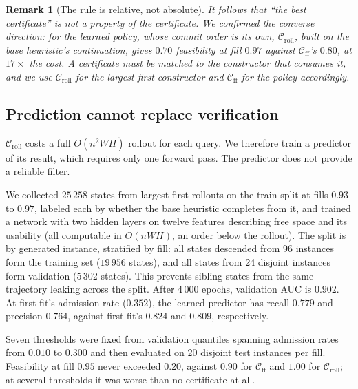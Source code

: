 \documentclass[preprint,12pt,authoryear]{elsarticle}
\newtheorem{rem}{Remark}
\newcommand{\cC}{\mathcal{C}}
\begin{document}
\begin{rem}[The rule is relative, not absolute]
\label{rem:witness}
It follows that ``the best certificate'' is not a property of the certificate. We
confirmed the converse direction: for the learned policy, whose commit order is
its own, $\cC_{\mathrm{roll}}$, built on the \emph{base heuristic's}
continuation, gives $0.70$ feasibility at fill $0.97$ against
$\cC_{\mathrm{ff}}$'s $0.80$, at $17\times$ the cost. A certificate must be
matched to the constructor that consumes it, and we use $\cC_{\mathrm{roll}}$ for
the largest first constructor and $\cC_{\mathrm{ff}}$ for the policy accordingly.
\end{rem}

\subsection{Prediction cannot replace verification}
\label{sec:learned_cert}

$\cC_{\mathrm{roll}}$ costs a full $O(n^2WH)$ rollout for each query. We
therefore train a predictor of its result, which requires only one forward pass.
The predictor does not provide a reliable filter.

We collected $25\,258$ states from largest first rollouts on the train split at
fills $0.93$ to $0.97$, labeled each by whether the base heuristic completes from
it, and trained a network with two hidden layers on twelve features describing free
space and its usability (all computable in $O(nWH)$, an order below the rollout).
The split is by generated instance, stratified by fill: all states descended
from 96 instances form the training set ($19\,956$ states), and all states from
24 disjoint instances form validation ($5\,302$ states). This prevents sibling
states from the same trajectory leaking across the split. After $4\,000$ epochs,
validation AUC is $0.902$. At first fit's admission rate ($0.352$), the learned
predictor has recall $0.779$ and precision $0.764$, against first fit's $0.824$
and $0.809$, respectively.

Seven thresholds were fixed from validation
quantiles spanning admission rates from $0.010$ to $0.300$ and then evaluated on
20 disjoint test instances per fill. Feasibility at fill $0.95$ never exceeded
$0.20$, against
$0.90$ for $\cC_{\mathrm{ff}}$ and $1.00$ for $\cC_{\mathrm{roll}}$; at
several thresholds it was worse than no certificate at all.
\end{document}
